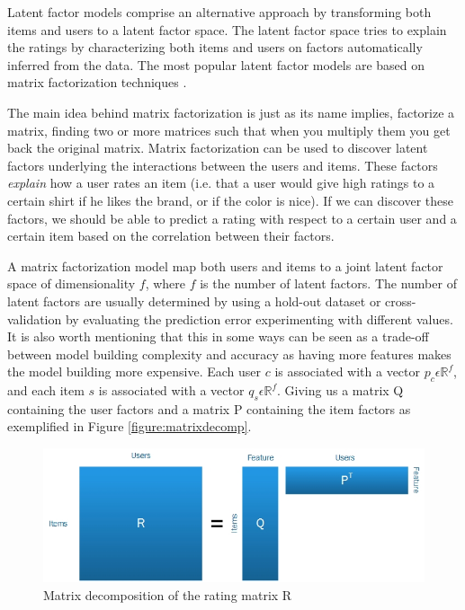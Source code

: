 Latent factor models comprise an alternative approach by transforming both items and users to a latent factor space. The latent factor space tries to explain the ratings by characterizing both items and users on factors automatically inferred from the data. The most popular latent factor models are based on matrix factorization techniques \cite{Koren2009}.

The main idea behind matrix factorization is just as its name implies, factorize a matrix, finding two or more matrices such that when you multiply them you get back the original matrix. Matrix factorization can be used to discover latent factors underlying the interactions between the users and items. These factors \emph{explain} how a user rates an item (i.e. that a user would give high ratings to a certain shirt if he likes the brand, or if the color is nice). If we can discover these factors, we should be able to predict a rating with respect to a certain user and a certain item based on the correlation between their factors.

A matrix factorization model map both users and items to a joint latent factor space of dimensionality $f$, where $f$ is the number of latent factors. The number of latent factors are usually determined by using a hold-out dataset or cross-validation by evaluating the prediction error experimenting with different values. It is also worth mentioning that this in some ways can be seen as a trade-off between model building complexity and accuracy as having more features makes the model building more expensive. Each user $c$ is associated with a vector $p_{c} \epsilon \mathbb{R}^{f}$, and each item $s$ is associated with a vector $q_{s} \epsilon \mathbb{R}^{f}$. Giving us a matrix Q containing the user factors and a matrix P containing the item factors as exemplified in Figure \ref{figure:matrixdecomp}.

\begin{figure}[H]
    \includegraphics[width=5in]{image/matrixdecomp.jpg}
    \centering
    \caption[Matrix decomposition of the rating matrix R]{Matrix decomposition of the rating matrix R}
    \label{figure:ratingmatrix}
\end{figure}

